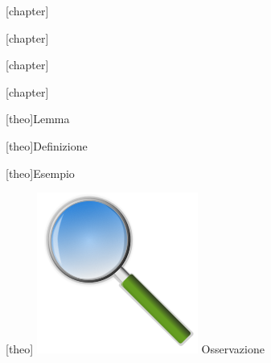 \theoremstyle{break}
\theoremheaderfont{\normalfont\bfseries}
\theorembodyfont{\itshape}
\theoremsymbol{\ensuremath{\diamondsuit}}
\theoremseparator{\newline}
[chapter]

\theoremstyle{break}
\theoremheaderfont{\normalfont\bfseries}
\theorembodyfont{\itshape}
\theoremsymbol{\ensuremath{\diamondsuit}}
\theoremseparator{\newline}
[chapter]

\theoremstyle{break}
\theoremheaderfont{\normalfont\bfseries}
\theorembodyfont{\itshape}
\theoremsymbol{\ensuremath{\diamondsuit}}
\theoremseparator{\newline}
[chapter]

\theoremstyle{break}
\theoremheaderfont{\normalfont\bfseries}
\theorembodyfont{\itshape}
\theoremsymbol{\ensuremath{\diamondsuit}}
\theoremseparator{\newline}
[chapter]
\theoremstyle{break}
\theoremheaderfont{\normalfont\bfseries}
\theorembodyfont{\itshape}
\theoremsymbol{\ensuremath{\diamondsuit}}
\theoremseparator{\newline}
[theo]{Lemma}

\theoremstyle{break}
\theoremsymbol{\ensuremath{\clubsuit}}
\theoremseparator{\newline}
[theo]{Definizione}

\theoremstyle{break}
\theorembodyfont{\itshape}
\theoremsymbol{\ensuremath{\ast}}
\theoremseparator{\newline}
[theo]{Esempio}

\theoremstyle{break}
\theorembodyfont{\itshape}
\theoremsymbol{\ensuremath{\ast}}
\theoremseparator{\newline}
[theo]{
\includegraphics[scale=0.06]{imgs/lens.png}
Osservazione
}

